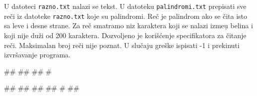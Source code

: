 \begin{Exercise}[label=p3_]         
U datoteci \verb|razno.txt| nalazi se tekst. U datoteku
\verb|palindromi.txt| prepisati sve re\v ci iz datoteke
\verb|razno.txt| koje su palindromi. Re\v c je palindrom ako se \v
cita isto sa leve i desne strane. Za re\v c smatramo niz karaktera
koji se nalazi izme\d u belina i koji nije du\v zi od 200
karaktera. Dozvoljeno je kori\v s\'cenje specifikatora za \v citanje
re\v ci. Maksimalan broj re\v ci nije poznat. U slu\v caju gre\v ske
ispisati -1 i prekinuti izvr\v savanje programa. \\
\begin{miditest}
\begin{upotreba}{1}
##
##
##
#
\end{upotreba}
\end{miditest}
\begin{miditest}
\begin{upotreba}{2}
##
##
##
##
#
##
\end{upotreba}
\end{miditest}
\end{Exercise}
\ifresenja
\begin{Answer}[ref=p3_]
\end{Answer}
\fi


